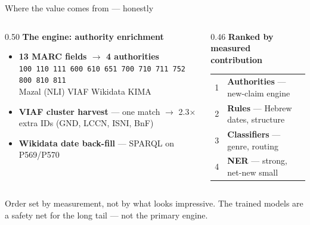 \documentclass[aspectratio=169,12pt]{beamer}
\begin{document}
\begin{frame}[t]{Where the value comes from --- honestly}
  \begin{columns}[T,onlytextwidth]
    \begin{column}{0.50\textwidth}
      \textbf{The engine: authority enrichment}
      \begin{itemize}
        \item \textbf{13 MARC fields $\rightarrow$ 4 authorities}\\
          {\footnotesize\texttt{100 110 111 600 610 651 700 710 711 752 800 810 811}}\\
          {\footnotesize Mazal (NLI) \textbullet{} VIAF \textbullet{} Wikidata \textbullet{} KIMA}
        \item \textbf{VIAF cluster harvest} --- one match $\rightarrow$ 2.3$\times$ extra IDs (GND, LCCN, ISNI, BnF)
        \item \textbf{Wikidata date back-fill} --- SPARQL on P569/P570
      \end{itemize}
    \end{column}
    \begin{column}{0.46\textwidth}
      \textbf{Ranked by measured contribution}
      \begin{tabular}{@{}p{}p{}@{}}
        \toprule
        1 & \textbf{Authorities} --- new-claim engine \\
        2 & \textbf{Rules} --- Hebrew dates, structure \\
        3 & \textbf{Classifiers} --- genre, routing \\
        4 & \textbf{NER} --- strong, net-new small \\
        \bottomrule
      \end{tabular}
    \end{column}
  \end{columns}
  \vfill
  {\footnotesize Order set by measurement, not by what looks impressive. The trained models are a safety net for the long tail --- not the primary engine.}
\end{frame}
\end{document}
